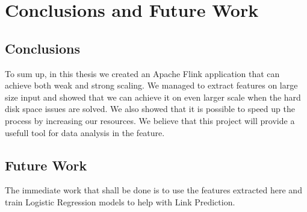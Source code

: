 \chapter{Conclusions and Future Work}

\section{Conclusions}
To sum up, in this thesis we created an Apache Flink application that can achieve both weak and strong scaling. We managed to extract features on large size input and showed that we can achieve it on even larger scale when the hard disk space issues are solved. We also showed that it is possible to speed up the process by increasing our resources.  We believe that this project will provide a usefull tool for data analysis in the feature.
\section{Future Work}
The immediate work that shall be done is to use the features extracted here and train Logistic Regression models to help with Link Prediction.